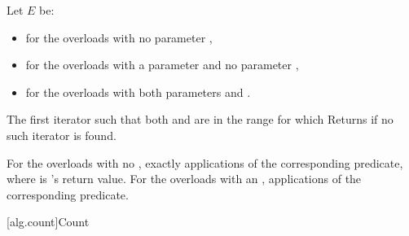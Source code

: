 \begin{itemdescr}
{\color{newclr}
\pnum
Let $E$ be:
\begin{itemize}
\item {} for the overloads with no parameter ,
\item {} for the overloads with a parameter  and no parameter ,
\item {} for the overloads with both parameters  and .
\end{itemize}
} %

\pnum
\returns
The first iterator
such that both
and
are in
the range
for which 
Returns 
if no such iterator is found.

\pnum
\complexity
For the overloads with no , exactly
applications of the corresponding predicate, where  is
's
return value.
  For the overloads with an ,
 applications of the corresponding predicate.
\end{itemdescr}

[alg.count]{Count}

